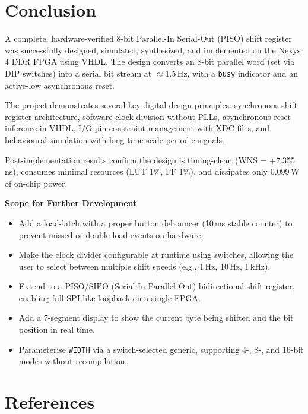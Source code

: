 \documentclass[12pt,a4paper]{report}
\begin{document}
\chapter{Conclusion}

A complete, hardware-verified 8-bit Parallel-In Serial-Out (PISO) shift register was successfully designed, simulated, synthesized, and implemented on the Nexys 4 DDR FPGA using VHDL. The design converts an 8-bit parallel word (set via DIP switches) into a serial bit stream at $\approx$1.5\,Hz, with a \texttt{busy} indicator and an active-low asynchronous reset.

The project demonstrates several key digital design principles: synchronous shift register architecture, software clock division without PLLs, asynchronous reset inference in VHDL, I/O pin constraint management with XDC files, and behavioural simulation with long time-scale periodic signals.

Post-implementation results confirm the design is timing-clean (WNS = +7.355\,ns), consumes minimal resources (LUT 1\%, FF 1\%), and dissipates only 0.099\,W of on-chip power.

\textbf{Scope for Further Development}
\begin{itemize}[leftmargin=1.5em]
  \item Add a load-latch with a proper button debouncer (10\,ms stable counter) to prevent missed or double-load events on hardware.
  \item Make the clock divider configurable at runtime using switches, allowing the user to select between multiple shift speeds (e.g., 1\,Hz, 10\,Hz, 1\,kHz).
  \item Extend to a PISO/SIPO (Serial-In Parallel-Out) bidirectional shift register, enabling full SPI-like loopback on a single FPGA.
  \item Add a 7-segment display to show the current byte being shifted and the bit position in real time.
  \item Parameterise \texttt{WIDTH} via a switch-selected generic, supporting 4-, 8-, and 16-bit modes without recompilation.
\end{itemize}

\chapter{References}
\end{document}
